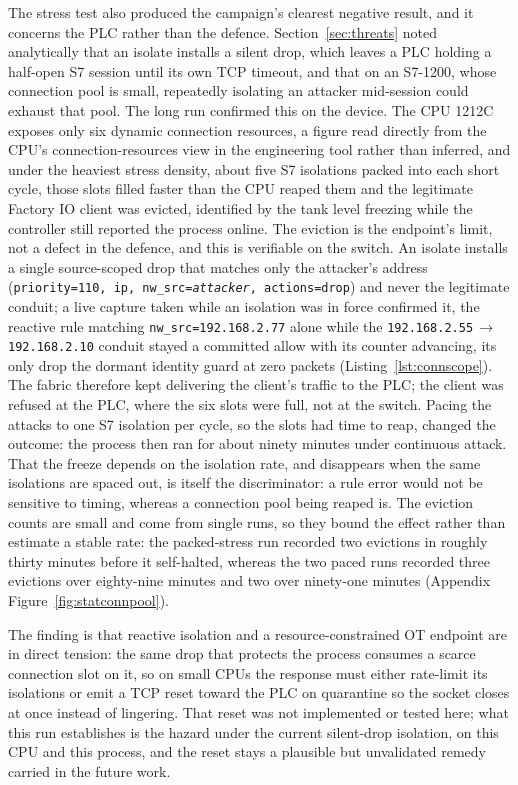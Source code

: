 The stress test also produced the campaign's clearest negative result, and it concerns the PLC rather than the defence. Section~\ref{sec:threats} noted analytically that an isolate installs a silent drop, which leaves a PLC holding a half-open S7 session until its own TCP timeout, and that on an S7-1200, whose connection pool is small, repeatedly isolating an attacker mid-session could exhaust that pool. The long run confirmed this on the device. The CPU 1212C exposes only six dynamic connection resources, a figure read directly from the CPU's connection-resources view in the engineering tool rather than inferred, and under the heaviest stress density, about five S7 isolations packed into each short cycle, those slots filled faster than the CPU reaped them and the legitimate Factory IO client was evicted, identified by the tank level freezing while the controller still reported the process online. The eviction is the endpoint's limit, not a defect in the defence, and this is verifiable on the switch. An isolate installs a single source-scoped drop that matches only the attacker's address (\texttt{priority=110, ip, nw\_src=\textit{attacker}, actions=drop}) and never the legitimate conduit; a live capture taken while an isolation was in force confirmed it, the reactive rule matching \texttt{nw\_src=192.168.2.77} alone while the \texttt{192.168.2.55}\,$\to$\,\texttt{192.168.2.10} conduit stayed a committed allow with its counter advancing, its only drop the dormant identity guard at zero packets (Listing~\ref{lst:connscope}). The fabric therefore kept delivering the client's traffic to the PLC; the client was refused at the PLC, where the six slots were full, not at the switch. Pacing the attacks to one S7 isolation per cycle, so the slots had time to reap, changed the outcome: the process then ran for about ninety minutes under continuous attack. That the freeze depends on the isolation rate, and disappears when the same isolations are spaced out, is itself the discriminator: a rule error would not be sensitive to timing, whereas a connection pool being reaped is. The eviction counts are small and come from single runs, so they bound the effect rather than estimate a stable rate: the packed-stress run recorded two evictions in roughly thirty minutes before it self-halted, whereas the two paced runs recorded three evictions over eighty-nine minutes and two over ninety-one minutes (Appendix Figure~\ref{fig:statconnpool}).

The finding is that reactive isolation and a resource-constrained OT endpoint are in direct tension: the same drop that protects the process consumes a scarce connection slot on it, so on small CPUs the response must either rate-limit its isolations or emit a TCP reset toward the PLC on quarantine so the socket closes at once instead of lingering. That reset was not implemented or tested here; what this run establishes is the hazard under the current silent-drop isolation, on this CPU and this process, and the reset stays a plausible but unvalidated remedy carried in the future work.

